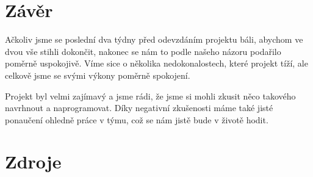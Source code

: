 \documentclass[11pt,a4paper]{article}
\begin{document}
\section{Závěr}
Ačkoliv jsme se poslední dva týdny před odevzdáním projektu báli, abychom ve dvou vše stihli dokončit, nakonec se nám to podle našeho názoru podařilo poměrně uspokojivě. Víme sice o několika nedokonalostech, které projekt tíží, ale celkově jsme se svými výkony poměrně spokojení.

Projekt byl velmi zajímavý a jsme rádi, že jsme si mohli zkusit něco takového navrhnout a naprogramovat. Díky negativní zkušenosti máme také jisté ponaučení ohledně práce v týmu, což se nám jistě bude v životě hodit.

\newpage

\section{Zdroje}
    
    

    
    

          
\end{document}
